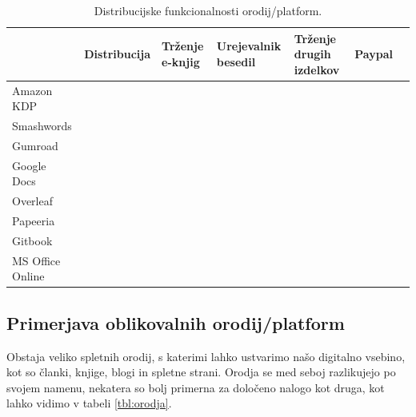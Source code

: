 \documentclass[a4paper, 12pt]{book}
\begin{document}
\begin{table}[h]
	\begin{center}
		\begin{tabular}{ | l | m{1.2cm} |m{1.2cm}|m{1.5cm} |m{1.2cm} | m{2cm}|m{1.2cm} |}
			\hline
			& \hspace*{0pt}Distribucija &\hspace*{0pt}Trženje e-knjig& \hspace*{0pt}Urejevalnik besedil & \hspace*{0pt}Trženje drugih izdelkov & \hspace*{0pt}Paypal  \\ \hline
			Amazon KDP & \checkmark & \checkmark &  &  &   \\
			Smashwords & \checkmark & \checkmark &  &  & \checkmark \\
			Gumroad    & \checkmark & \checkmark &  &  \checkmark & \checkmark \\
			Google Docs & \checkmark & & \checkmark & & \\
			Overleaf & \checkmark & & \checkmark & & \\
			Papeeria & & & \checkmark  & & \\
			Gitbook & \checkmark & \checkmark & \checkmark & & \\
			MS Office Online & \checkmark & & \checkmark & & 	\\
			\hline
		\end{tabular}
	\end{center} 
	\caption{Distribucijske funkcionalnosti orodij/platform.}
	\label{tbl:platforme}
\end{table}



\subsection{Primerjava oblikovalnih orodij/platform}
Obstaja veliko spletnih orodij, s katerimi lahko ustvarimo našo digitalno vsebino, kot so članki, knjige, blogi in spletne strani. Orodja se med seboj razlikujejo po svojem namenu, nekatera so bolj primerna za določeno nalogo kot druga, kot lahko vidimo v tabeli \ref{tbl:orodja}. 
\end{document}
